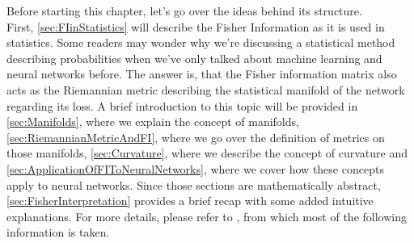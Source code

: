 Before starting this chapter, let's go over the ideas behind its structure.\\
First, \cref{sec:FIinStatistics} will describe the Fisher Information as it is used in statistics. Some readers may wonder why we're discussing a statistical method describing probabilities when we've only talked about machine learning and neural networks before. The answer is, that the Fisher information matrix also
acts as the Riemannian metric describing the statistical manifold of the network regarding its loss. A brief introduction to this topic will be provided in \cref{sec:Manifolds}, where we explain the concept of manifolds, \cref{sec:RiemannianMetricAndFI}, where we go over the definition of metrics on those manifolds, \cref{sec:Curvature}, where we describe the concept of curvature and \cref{sec:ApplicationOfFIToNeuralNetworks}, where we cover how these concepts apply to neural networks. Since those sections are mathematically abstract, \cref{sec:FisherInterpretation} provides a brief recap with some added intuitive explanations. For more details, please refer to \cite{AmarisLectureNotes}, from which most of the following information is taken.